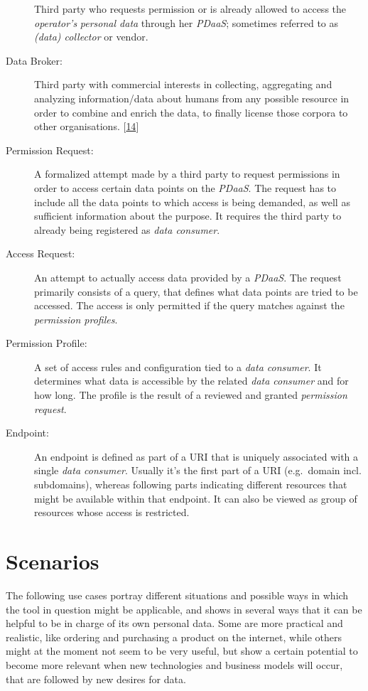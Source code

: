 \documentclass[12pt,english,a4paper,titlepage,cleardoublepage=empty,dottedtoc]{report}
\begin{document}
\begin{description}
Third party who requests permission or is already allowed to access the
\emph{operator's} \emph{personal data} through her \emph{PDaaS};
sometimes referred to as \emph{(data) collector} or vendor.
\item[\protect\hypertarget{terminologies--data-broker}{}{Data Broker}:]
Third party with commercial interests in collecting, aggregating and
analyzing information/data about humans from any possible resource in
order to combine and enrich the data, to finally license those corpora
to other organisations.
{[}\protect\hyperlink{ref-report_2014_data-brokers}{14}{]}
\item[Permission Request:]
A formalized attempt made by a third party to request permissions in
order to access certain data points on the \emph{PDaaS}. The request has
to include all the data points to which access is being demanded, as
well as sufficient information about the purpose. It requires the third
party to already being registered as \emph{data consumer}.
\item[Access Request:]
An attempt to actually access data provided by a \emph{PDaaS}. The
request primarily consists of a query, that defines what data points are
tried to be accessed. The access is only permitted if the query matches
against the \emph{permission profiles}.
\item[Permission Profile:]
A set of access rules and configuration tied to a \emph{data consumer}.
It determines what data is accessible by the related \emph{data
consumer} and for how long. The profile is the result of a reviewed and
granted \emph{permission request}.
\item[Endpoint:]
An endpoint is defined as part of a URI that is uniquely associated with
a single \emph{data consumer}. Usually it's the first part of a URI
(e.g.~domain incl. subdomains), whereas following parts indicating
different resources that might be available within that endpoint. It can
also be viewed as group of resources whose access is restricted.
\end{description}

\hypertarget{scenarios}{\section{Scenarios}\label{scenarios}}

The following use cases portray different situations and possible ways
in which the tool in question might be applicable, and shows in several
ways that it can be helpful to be in charge of its own personal data.
Some are more practical and realistic, like ordering and purchasing a
product on the internet, while others might at the moment not seem to be
very useful, but show a certain potential to become more relevant when
new technologies and business models will occur, that are followed by
new desires for data.
\end{document}
